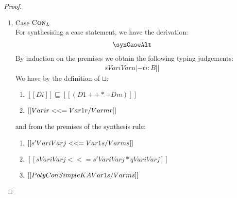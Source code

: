 \begin{proof}
\begin{enumerate}
\item Case $\textsc{Con}_{L}$ \\
        For synthesising a case statement, we have the derivation:
        \begin{align*}
          \synCaseAlt
        \end{align*}
        By induction on the premises we obtain the following typing judgements:
        \begin{align*}
          [[ {{Di, x : [K A] {ri}}, {y Vari Var1} : [B1] {s Vari Var1} } , .M. , {y Vari Varn} : [Bn] {s Vari Varn} |- ti : B ]]
        \end{align*}
        We have by the definition of $\sqcup$:
        \begin{enumerate}
                \item $ [[ Di]] \sqsubseteq [[(D1 ++*+ Dm) ]]$
                \item $ [[ {Vari r} <<= {{Var1 r} \*/ {Varm r}}  ]]$
        \end{enumerate}

        and from the premises of the synthesis rule:
        \begin{enumerate}[resume]
                \item $[[ {s' Vari Varj} <<= {{Var1 s} \*/ {Varm s}} ]]$
                \item $ [[ {s Vari Varj} <<= {s' Vari Varj } * {q Vari Varj} ]]$
                \item $ [[ {PolyConSimple {K A} {{Var1 s} \*/ {Varm s}}} ]] $
        \end{enumerate}


\end{enumerate}
\end{proof}
